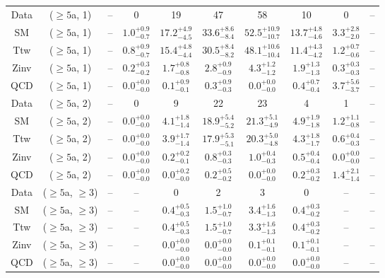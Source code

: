 \begin{table}[h!]
{\begin{tabular}{cccccccccc}
	Data & ($\ge5$a, 1) & -- & 0 & 19 & 47 & 58 & 10 & 0 & -- \\[0.5ex] 
	SM & ($\ge5$a, 1) & -- & $1.0^{+ 0.9 }_{- 0.7 }$ & $17.2^{+ 4.9 }_{- 4.5 }$ & $33.6^{+ 8.6 }_{- 8.4 }$ & $52.5^{+ 10.9 }_{- 10.7 }$ & $13.7^{+ 4.8 }_{- 4.6 }$ & $3.3^{+ 2.8 }_{- 2.0 }$ & -- \\[0.5ex] 
	Ttw & ($\ge5$a, 1) & -- & $0.8^{+ 0.9 }_{- 0.7 }$ & $15.4^{+ 4.8 }_{- 4.4 }$ & $30.5^{+ 8.4 }_{- 8.2 }$ & $48.1^{+ 10.6 }_{- 10.4 }$ & $11.4^{+ 4.3 }_{- 4.2 }$ & $1.2^{+ 0.7 }_{- 0.6 }$ & -- \\[0.5ex] 
	Zinv & ($\ge5$a, 1) & -- & $0.2^{+ 0.3 }_{- 0.2 }$ & $1.7^{+ 0.8 }_{- 0.8 }$ & $2.8^{+ 0.9 }_{- 0.9 }$ & $4.3^{+ 1.2 }_{- 1.2 }$ & $1.9^{+ 1.3 }_{- 1.3 }$ & $0.3^{+ 0.3 }_{- 0.3 }$ & -- \\[0.5ex] 
	QCD & ($\ge5$a, 1) & -- & $0.0^{+ 0.0 }_{- 0.0 }$ & $0.1^{+ 0.9 }_{- 0.1 }$ & $0.3^{+ 0.9 }_{- 0.3 }$ & $0.0^{+ 0.0 }_{- 0.0 }$ & $0.4^{+ 0.7 }_{- 0.4 }$ & $3.7^{+ 5.6 }_{- 3.7 }$ & -- \\[0.5ex] 
	Data & ($\ge5$a, 2) & -- & 0 & 9 & 22 & 23 & 4 & 1 & -- \\[0.5ex] 
	SM & ($\ge5$a, 2) & -- & $0.0^{+ 0.0 }_{- 0.0 }$ & $4.1^{+ 1.8 }_{- 1.4 }$ & $18.9^{+ 5.4 }_{- 5.2 }$ & $21.3^{+ 5.1 }_{- 4.9 }$ & $4.9^{+ 1.9 }_{- 1.8 }$ & $1.2^{+ 1.1 }_{- 0.8 }$ & -- \\[0.5ex] 
	Ttw & ($\ge5$a, 2) & -- & $0.0^{+ 0.0 }_{- 0.0 }$ & $3.9^{+ 1.7 }_{- 1.4 }$ & $17.9^{+ 5.3 }_{- 5.1 }$ & $20.3^{+ 5.0 }_{- 4.8 }$ & $4.3^{+ 1.8 }_{- 1.7 }$ & $0.6^{+ 0.4 }_{- 0.3 }$ & -- \\[0.5ex] 
	Zinv & ($\ge5$a, 2) & -- & $0.0^{+ 0.0 }_{- 0.0 }$ & $0.2^{+ 0.2 }_{- 0.1 }$ & $0.8^{+ 0.3 }_{- 0.3 }$ & $1.0^{+ 0.4 }_{- 0.3 }$ & $0.5^{+ 0.4 }_{- 0.4 }$ & $0.0^{+ 0.0 }_{- 0.0 }$ & -- \\[0.5ex] 
	QCD & ($\ge5$a, 2) & -- & $0.0^{+ 0.0 }_{- 0.0 }$ & $0.0^{+ 0.2 }_{- 0.0 }$ & $0.2^{+ 0.5 }_{- 0.2 }$ & $0.0^{+ 0.0 }_{- 0.0 }$ & $0.2^{+ 0.3 }_{- 0.2 }$ & $1.4^{+ 2.1 }_{- 1.4 }$ & -- \\[0.5ex] 
	Data & ($\ge5$a, $\ge3$) & -- & -- & 0 & 2 & 3 & 0 & -- & -- \\[0.5ex] 
	SM & ($\ge5$a, $\ge3$) & -- & -- & $0.4^{+ 0.5 }_{- 0.3 }$ & $1.5^{+ 1.0 }_{- 0.7 }$ & $3.4^{+ 1.6 }_{- 1.3 }$ & $0.4^{+ 0.3 }_{- 0.2 }$ & -- & -- \\[0.5ex] 
	Ttw & ($\ge5$a, $\ge3$) & -- & -- & $0.4^{+ 0.5 }_{- 0.3 }$ & $1.5^{+ 1.0 }_{- 0.7 }$ & $3.3^{+ 1.6 }_{- 1.3 }$ & $0.4^{+ 0.3 }_{- 0.2 }$ & -- & -- \\[0.5ex] 
	Zinv & ($\ge5$a, $\ge3$) & -- & -- & $0.0^{+ 0.0 }_{- 0.0 }$ & $0.0^{+ 0.0 }_{- 0.0 }$ & $0.1^{+ 0.1 }_{- 0.1 }$ & $0.1^{+ 0.1 }_{- 0.1 }$ & -- & -- \\[0.5ex] 
	QCD & ($\ge5$a, $\ge3$) & -- & -- & $0.0^{+ 0.0 }_{- 0.0 }$ & $0.0^{+ 0.0 }_{- 0.0 }$ & $0.0^{+ 0.0 }_{- 0.0 }$ & $0.0^{+ 0.0 }_{- 0.0 }$ & -- & -- \\[0.5ex] 
	\hline
	\hline
\end{tabular}}
\end{table}
